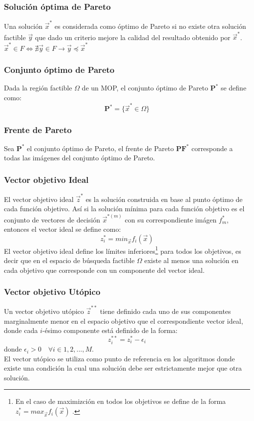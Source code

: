 \subsubsection*{Solución óptima de Pareto}
Una solución $\vec{x}^*$ es considerada como óptimo de Pareto si no existe otra solución factible $\vec{y}$ que dado un criterio mejore la calidad del resultado obtenido por $\vec{x}^*$.\\
$\vec{x}^* \in F  \iff  \nexists \vec{y} \in F \rightarrow \vec{y} \preceq \vec{x}^*  $ 
\subsubsection*{Conjunto óptimo de Pareto}
Dada la región factible $\Omega$ de un MOP, el conjunto óptimo de Pareto $\mathbf{P^*}$ se define como:
\begin{equation*}
\mathbf{P^*} = \{ \vec{x}^* \in \Omega  \}
\end{equation*}
\subsubsection*{Frente de Pareto}
Sea $\mathbf{P^*}$ el conjunto óptimo de Pareto, el frente de Pareto $\mathbf{PF^*}$ corresponde a todas las imágenes del conjunto óptimo de Pareto.
\subsubsection*{Vector objetivo Ideal}
El vector objetivo ideal $\vec{z}^*$ es la solución construida en base al punto óptimo de cada función objetivo. 
%
Así si la solución mínima para cada función objetivo es el conjunto de vectores de decisión $\vec{x}^{*(m)}$ con su correspondiente imágen ${f_m^*}$, entonces  el vector ideal se define como:
\begin{equation*}
z_i^* = min_{\vec{x}} f_i(\vec{x})
\end{equation*}
El vector objetivo ideal define los límites inferiores\footnote{En el caso de maximizción en todos los objetivos se define de la forma $z_i^* = max_{\vec{x}} f_i(\vec{x})$ .} para todos los objetivos, es decir que en el espacio de búsqueda factible $\Omega$ existe al menos una solución en cada objetivo que corresponde con un componente del vector ideal.
\subsubsection*{Vector objetivo Utópico}
Un vector objetivo utópico $\vec{z}^{**}$ tiene definido cada uno de sus componentes marginalmente menor en el espacio objetivo que el correspondiente vector ideal, donde cada $i$-ésimo componente está definido de la forma:
\begin{equation}
z_i^{**} = z_i^* - \epsilon_i
\end{equation}
donde $\epsilon_i > 0 \quad \forall i \in {1, 2, ..., M}$.
\\
El vector utópico se utiliza como punto de referencia en los algoritmos donde existe una condición la cual una solución debe ser estrictamente mejor que otra solución.
